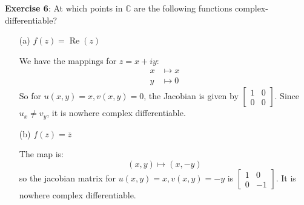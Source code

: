 \documentclass{article}
\begin{document}
\textbf{Exercise 6}: At which points in $\mathbb{C}$ are the following functions complex-differentiable?
    \begin{itemize}
        \item [(a)] $f(z) = \mathop{Re}(z)$
            \begin{answer}
                We have the mappings for $z = x + iy$:
                    \begin{align*}
                        x &\mapsto x \\
                        y &\mapsto 0   
                    \end{align*}
                So for $u(x, y) = x, v(x, y) = 0$, the Jacobian is given by $\begin{bmatrix}
                    1 & 0 \\
                    0 & 0   
                \end{bmatrix}$. Since $u_{x} \neq v_{y}$, it is nowhere complex differentiable.
            \end{answer}

        \item [(b)] $f(z) = \overline{z}$
            \begin{answer}
                The map is:
                    \begin{equation*}
                        (x, y) \mapsto (x, -y)
                    \end{equation*}
                so the jacobian matrix for $u(x, y) = x, v(x, y) = -y$ is $\begin{bmatrix}
                    1 & 0  \\
                    0 & -1   
                \end{bmatrix}$. It is nowhere complex differentiable.
            \end{answer}


\end{itemize}
\end{document}
